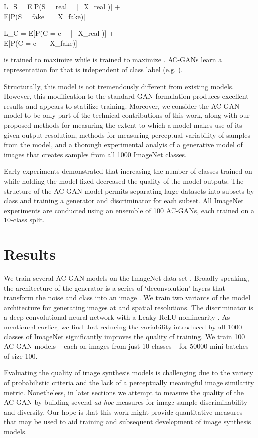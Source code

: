 \documentclass{article}
\begin{document}
L_S = E[\log P(S = real ~~|~ X_{real} )] + \\ E[\log P(S = fake ~|~ X_{fake})]

L_C = E[\log P(C = c ~~|~ X_{real} )] + \\ E[\log P(C = c ~|~ X_{fake})]


 is trained to maximize  while  is trained to maximize .
AC-GANs learn a representation for  that is independent of class label (e.g. \cite{SSVAE}).

Structurally, this model is not tremendously different from existing models.
However, this modification to the standard GAN formulation produces
excellent results and appears to stabilize training.
Moreover, we consider the AC-GAN model to be only part of the technical
contributions of this work, along with our proposed methods for
measuring the extent to which a model makes use of its given output resolution,
methods for measuring perceptual variability of samples from the model,
and a thorough experimental analyis of a generative model of images
that creates  samples from all 1000 ImageNet classes.

Early experiments demonstrated that increasing the number of
classes trained on while holding the model fixed decreased the quality
of the model outputs. The structure of the
AC-GAN model permits
separating large datasets into subsets by class
and training a generator and discriminator for each subset.
All ImageNet experiments are conducted using an ensemble of 100 AC-GANs, each trained on a 10-class split.

\section{Results}

We train several AC-GAN models on the ImageNet data set
\citep{IMAGENET}. Broadly speaking, the architecture of the generator 
is a series of `deconvolution' layers
that transform the noise
 and class  into an image
\citep{NNDECONV}. 
We train two variants of the model architecture for
generating images at  and
 spatial resolutions.
The discriminator  is a
deep convolutional neural network with a Leaky ReLU nonlinearity \citep{Maas2013}.
As mentioned earlier, we find that reducing the variability introduced by
all 1000 classes of ImageNet significantly improves the quality of training.
We train 100 AC-GAN models -- each on images from just 10 classes
-- for 50000 mini-batches of size 100.

Evaluating the quality of image synthesis models is challenging due to 
the variety of probabilistic criteria \citep{TheisEtAl}
and the lack of a perceptually meaningful image similarity metric.
Nonetheless, in later sections we attempt to measure the quality of
the AC-GAN by building several \textit{ad-hoc} measures for
image sample discriminability and diversity.
Our hope is that this work might 
provide quantitative measures that may be used to aid training and subsequent
development of image synthesis models.
\end{document}
